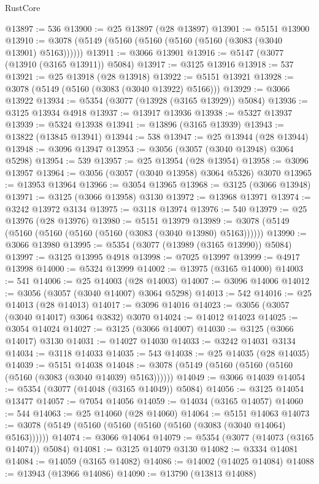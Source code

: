 \begin{lexlean}{RustCore}
\begin{coremodule}
@13897 := 536
@13900 := @25 @13897 (@28 @13897)
@13901 := @5151 @13900
@13910 := @3078 (@5149 (@5160 (@5160 (@5160 (@5160 (@3083 (@3040 @13901) @5163))))))
@13911 := @3066 @13901
@13916 := @5147 (@3077 (@13910 (@3165 @13911)) @5084)
@13917 := @3125 @13916
@13918 := 537
@13921 := @25 @13918 (@28 @13918)
@13922 := @5151 @13921
@13928 := @3078 (@5149 (@5160 (@3083 (@3040 @13922) @5166)))
@13929 := @3066 @13922
@13934 := @5354 (@3077 (@13928 (@3165 @13929)) @5084)
@13936 := @3125 @13934 @4918
@13937 := @13917 @13936
@13938 := @5327 @13937
@13939 := @5324 @13938
@13941 := @13896 (@3165 @13939)
@13943 := @13822 (@13845 @13941)
@13944 := 538
@13947 := @25 @13944 (@28 @13944)
@13948 := @3096 @13947
@13953 := @3056 (@3057 (@3040 @13948) @3064 @5298)
@13954 := 539
@13957 := @25 @13954 (@28 @13954)
@13958 := @3096 @13957
@13964 := @3056 (@3057 (@3040 @13958) @3064 @5326) @3070
@13965 := @13953 @13964
@13966 := @3054 @13965
@13968 := @3125 (@3066 @13948)
@13971 := @3125 (@3066 @13958) @3130
@13972 := @13968 @13971
@13974 := @3242 @13972 @3134
@13975 := @3118 @13974
@13976 := 540
@13979 := @25 @13976 (@28 @13976)
@13980 := @5151 @13979
@13989 := @3078 (@5149 (@5160 (@5160 (@5160 (@5160 (@3083 (@3040 @13980) @5163))))))
@13990 := @3066 @13980
@13995 := @5354 (@3077 (@13989 (@3165 @13990)) @5084)
@13997 := @3125 @13995 @4918
@13998 := @7025 @13997
@13999 := @4917 @13998
@14000 := @5324 @13999
@14002 := @13975 (@3165 @14000)
@14003 := 541
@14006 := @25 @14003 (@28 @14003)
@14007 := @3096 @14006
@14012 := @3056 (@3057 (@3040 @14007) @3064 @5298)
@14013 := 542
@14016 := @25 @14013 (@28 @14013)
@14017 := @3096 @14016
@14023 := @3056 (@3057 (@3040 @14017) @3064 @3832) @3070
@14024 := @14012 @14023
@14025 := @3054 @14024
@14027 := @3125 (@3066 @14007)
@14030 := @3125 (@3066 @14017) @3130
@14031 := @14027 @14030
@14033 := @3242 @14031 @3134
@14034 := @3118 @14033
@14035 := 543
@14038 := @25 @14035 (@28 @14035)
@14039 := @5151 @14038
@14048 := @3078 (@5149 (@5160 (@5160 (@5160 (@5160 (@3083 (@3040 @14039) @5163))))))
@14049 := @3066 @14039
@14054 := @5354 (@3077 (@14048 (@3165 @14049)) @5084)
@14056 := @3125 @14054 @13477
@14057 := @7054 @14056
@14059 := @14034 (@3165 @14057)
@14060 := 544
@14063 := @25 @14060 (@28 @14060)
@14064 := @5151 @14063
@14073 := @3078 (@5149 (@5160 (@5160 (@5160 (@5160 (@3083 (@3040 @14064) @5163))))))
@14074 := @3066 @14064
@14079 := @5354 (@3077 (@14073 (@3165 @14074)) @5084)
@14081 := @3125 @14079 @3130
@14082 := @3334 @14081
@14084 := @14059 (@3165 @14082)
@14086 := @14002 (@14025 @14084)
@14088 := @13943 (@13966 @14086)
@14090 := @13790 (@13813 @14088)

\end{coremodule}
\end{lexlean}
